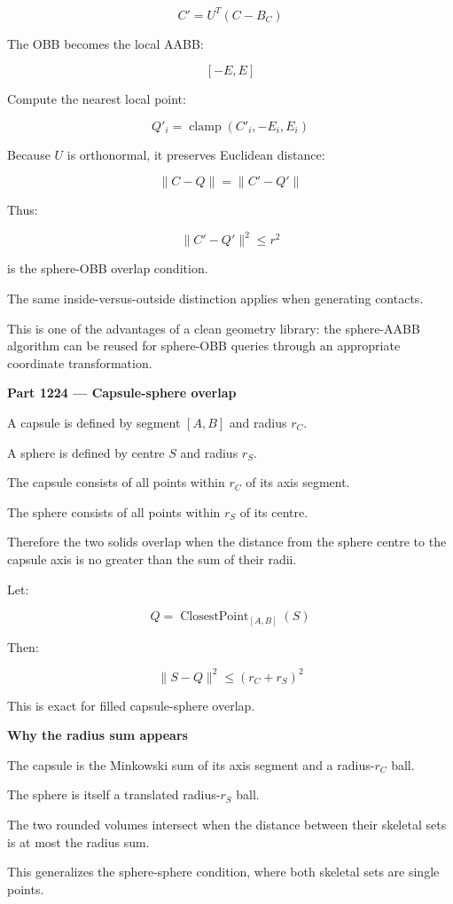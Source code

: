 \[
\boxed{ C'=U^T(C-B_C) }
\]

The OBB becomes the local AABB:

\[
[-E,E]
\]

Compute the nearest local point:

\[
\boxed{ Q'_i=\operatorname{clamp}(C'_i,-E_i,E_i) }
\]

Because \(U\) is orthonormal, it preserves Euclidean distance:

\[
\|C-Q\|=\|C'-Q'\|
\]

Thus:

\[
\boxed{ \|C'-Q'\|^2\le r^2 }
\]

is the sphere-OBB overlap condition.

The same inside-versus-outside distinction applies when generating contacts.

This is one of the advantages of a clean geometry library: the sphere-AABB algorithm can be reused for sphere-OBB queries through an appropriate coordinate transformation.

\textbf{Part 1224 --- Capsule-sphere overlap}

A capsule is defined by segment \([A,B]\) and radius \(r_C\).

A sphere is defined by centre \(S\) and radius \(r_S\).

The capsule consists of all points within \(r_C\) of its axis segment.

The sphere consists of all points within \(r_S\) of its centre.

Therefore the two solids overlap when the distance from the sphere centre to the capsule axis is no greater than the sum of their radii.

Let:

\[
Q=\operatorname{ClosestPoint}_{[A,B]}(S)
\]

Then:

\[
\boxed{ \|S-Q\|^2\le(r_C+r_S)^2 }
\]

This is exact for filled capsule-sphere overlap.

\textbf{Why the radius sum appears}

The capsule is the Minkowski sum of its axis segment and a radius-\(r_C\) ball.

The sphere is itself a translated radius-\(r_S\) ball.

The two rounded volumes intersect when the distance between their skeletal sets is at most the radius sum.

This generalizes the sphere-sphere condition, where both skeletal sets are single points.

